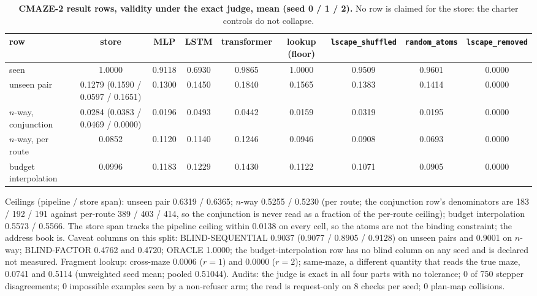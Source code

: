 \documentclass{article} %
\begin{document}
\begin{table}[h]
\centering\scriptsize
\caption{\textbf{CMAZE-2 result rows, validity under the exact judge, mean (seed 0 / 1 / 2).} No
row is claimed for the store: the charter controls do not collapse.}
\label{tab:cmaze2}
\setlength{\tabcolsep}{1.8pt}
\begin{adjustbox}{max width=\linewidth}\begin{tabular}{lcccccccc}
\toprule
row & store & MLP & LSTM & transformer & lookup (floor) & \texttt{lscape\_shuffled} & \texttt{random\_atoms} & \texttt{lscape\_removed} \\
\midrule
seen & 1.0000 & 0.9118 & 0.6930 & 0.9865 & 1.0000 & 0.9509 & 0.9601 & 0.0000 \\
unseen pair & 0.1279 (0.1590 / 0.0597 / 0.1651) & 0.1300 & 0.1450 & 0.1840 & 0.1565 & 0.1383 & 0.1414 & 0.0000 \\
$n$-way, conjunction & 0.0284 (0.0383 / 0.0469 / 0.0000) & 0.0196 & 0.0493 & 0.0442 & 0.0159 & 0.0319 & 0.0195 & 0.0000 \\
$n$-way, per route & 0.0852 & 0.1120 & 0.1140 & 0.1246 & 0.0946 & 0.0908 & 0.0693 & 0.0000 \\
budget interpolation & 0.0996 & 0.1183 & 0.1229 & 0.1430 & 0.1122 & 0.1071 & 0.0905 & 0.0000 \\
\bottomrule
\end{tabular}\end{adjustbox}
\end{table}

\noindent Ceilings (pipeline / store span): unseen pair 0.6319 / 0.6365; $n$-way 0.5255 / 0.5230
(per route; the conjunction row's denominators are 183 / 192 / 191 against per-route 389 / 403 /
414, so the conjunction is never read as a fraction of the per-route ceiling); budget interpolation
0.5573 / 0.5566. The store span tracks the pipeline ceiling within 0.0138 on every cell, so the
atoms are not the binding constraint; the address book is. Caveat columns on this split:
BLIND-SEQUENTIAL 0.9037 (0.9077 / 0.8905 / 0.9128) on unseen pairs and 0.9001 on $n$-way;
BLIND-FACTOR 0.4762 and 0.4720; ORACLE 1.0000; the budget-interpolation row has no blind column on
any seed and is declared not measured. Fragment lookup: cross-maze 0.0006 ($r=1$) and 0.0000
($r=2$); same-maze, a different quantity that reads the true maze, 0.0741 and 0.5114 (unweighted
seed mean; pooled 0.51044). %
Audits: the judge is exact in all four parts with no tolerance; 0 of 750 stepper disagreements; 0
impossible examples seen by a non-refuser arm; the read is request-only on 8 checks per seed; 0
plan-map collisions. %
\end{document}
